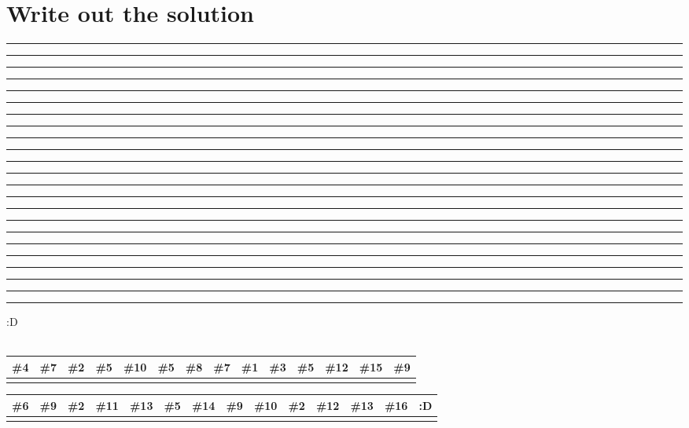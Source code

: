\documentclass[12pt]{article}
\begin{document}
\section*{Write out the solution}
\noindent 
\rule{0.4cm}{0.4pt} \rule{0.4cm}{0.4pt} \rule{0.4cm}{0.4pt} 
\quad 
\rule{0.4cm}{0.4pt} 
\quad 
\rule{0.4cm}{0.4pt} \rule{0.4cm}{0.4pt} \rule{0.4cm}{0.4pt} \rule{0.4cm}{0.4pt} 
\quad
\rule{0.4cm}{0.4pt} \rule{0.4cm}{0.4pt} \rule{0.4cm}{0.4pt}
\quad 
\rule{0.4cm}{0.4pt} \rule{0.4cm}{0.4pt} \rule{0.4cm}{0.4pt} \rule{0.4cm}{0.4pt} \rule{0.4cm}{0.4pt} 
\quad 
\rule{0.4cm}{0.4pt} \rule{0.4cm}{0.4pt} \rule{0.4cm}{0.4pt} \rule{0.4cm}{0.4pt} \rule{0.4cm}{0.4pt} \rule{0.4cm}{0.4pt} 
\quad 
\rule{0.4cm}{0.4pt} :D
\\\\
\noindent %
\begin{tabular}{|*{14}{W|}} 
\hline
\textbf{\#4} & \textbf{\#7} & \textbf{\#2} & \textbf{\#5} & \textbf{\#10} & \textbf{\#5} & \textbf{\#8} & \textbf{\#7} & \textbf{\#1} & \textbf{\#3} & \textbf{\#5} & \textbf{\#12} & \textbf{\#15} & \textbf{\#9} \\

\hline
& & & & & & & & & & & & & \\
\hline
\end{tabular}

\vspace{1em} %

\noindent
\begin{tabular}{|*{14}{W|}} 
\hline
\textbf{\#6} & \textbf{\#9} & \textbf{\#2} & \textbf{\#11} & \textbf{\#13} & \textbf{\#5} & \textbf{\#14} & \textbf{\#9} & \textbf{\#10} & \textbf{\#2} & \textbf{\#12} & \textbf{\#13} & \textbf{\#16} & \textbf{:D} \\
\hline
& & & & & & & & & & & & & \\
\hline
\end{tabular}
\end{document}

